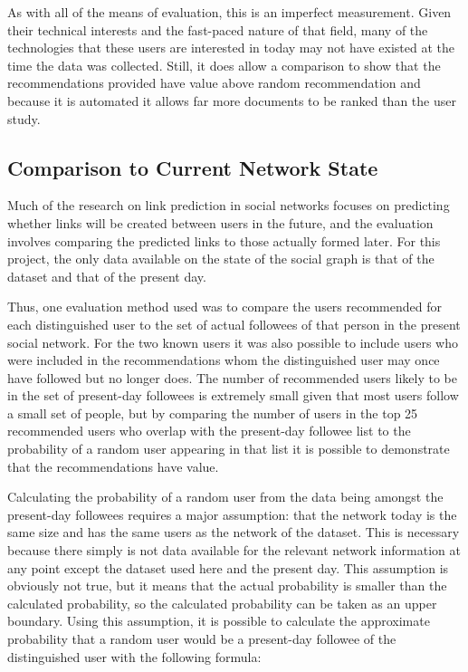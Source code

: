 As with all of the means of evaluation, this is an imperfect measurement. Given their technical interests and the fast-paced nature of that field, many of the technologies that these users are interested in today may not have existed at the time the data was collected. Still, it does allow a comparison to show that the recommendations provided have value above random recommendation and because it is automated it allows far more documents to be ranked than the user study.

\subsection{Comparison to Current Network State}

Much of the research on link prediction in social networks focuses on predicting whether links will be created between users in the future, and the evaluation involves comparing the predicted links to those actually formed later. For this project, the only data available on the state of the social graph is that of the dataset and that of the present day.

Thus, one evaluation method used was to compare the users recommended for each distinguished user to the set of actual followees of that person in the present social network. For the two known users it was also possible to include users who were included in the recommendations whom the distinguished user may once have followed but no longer does. The number of recommended users likely to be in the set of present-day followees is extremely small given that most users follow a small set of people, but by comparing the number of users in the top 25 recommended users who overlap with the present-day followee list to the probability of a random user appearing in that list it is possible to demonstrate that the recommendations have value.

Calculating the probability of a random user from the data being amongst the present-day followees requires a major assumption: that the network today is the same size and has the same users as the network of the dataset. This is necessary because there simply is not data available for the relevant network information at any point except the dataset used here and the present day. This assumption is obviously not true, but it means that the actual probability is smaller than the calculated probability, so the calculated probability can be taken as an upper boundary. Using this assumption, it is possible to calculate the approximate probability that a random user would be a present-day followee of the distinguished user with the following formula:


